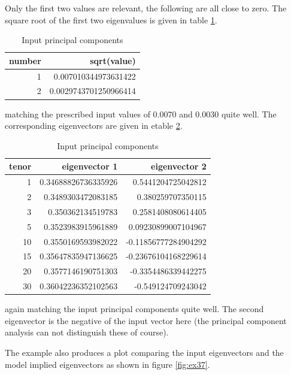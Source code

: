 Only the first two values are relevant, the following are all close to zero. The square root of the first two
eigenvalues is given in table \ref{tab:ex37_3}.

\begin{table}[hbt]
\begin{center}
\begin{tabular}{r|r}
number & sqrt(value)                \\
\hline      
1      & 0.007010344973631422       \\
2      & 0.0029743701250966414      \\
\end{tabular}
\caption{Input principal components}
\label{tab:ex37_3}
\end{center}
\end{table}

matching the prescribed input values of 0.0070 and 0.0030 quite well. The corresponding eigenvectors are given in etable
\ref{tab:ex37_4}.

\begin{table}[hbt]
\begin{center}
\begin{tabular}{r|r|r}
tenor & eigenvector 1       & eigenvector 2       \\
\hline      
1     & 0.34688826736335926 & 0.5441204725042812  \\
2     & 0.3489303472083185  & 0.380259707350115   \\
3     & 0.350362134519783   & 0.2581408080614405  \\
5     & 0.3523983915961889  & 0.09230899007104967 \\
10    & 0.3550169593982022  & -0.11856777284904292\\
15    & 0.35647835947136625 & -0.23676104168229614\\
20    & 0.3577146190751303  & -0.3354486339442275 \\
30    & 0.36042236352102563 & -0.549124709243042  \\
\end{tabular}
\caption{Input principal components}
\label{tab:ex37_4}
\end{center}
\end{table}

again matching the input principal components quite well. The second eigenvector is the negative of the input vector
here (the principal component analysis can not distinguish these of course).

The example also produces a plot comparing the input eigenvectors and the model implied eigenvectors as shown in figure \ref{fig:ex37}.


